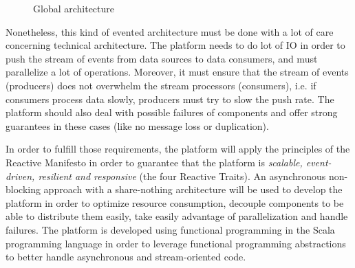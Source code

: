 \begin{figure}[h]
  \begin{center}
    \caption{Global architecture}
    \label{fig:main_archi}
  \end{center}
\end{figure}

Nonetheless, this kind of evented architecture must be done with a lot of care concerning technical architecture.
The platform needs to do lot of IO in order to push the stream of events from data sources to data consumers, and must
parallelize a lot of operations. Moreover, it must ensure that the stream of events (producers) does not overwhelm the stream
processors (consumers), i.e. if consumers process data slowly, producers must try to slow the push rate. The platform should also deal with possible
failures of components and offer strong guarantees in these cases (like no message loss or duplication).

In order to fulfill those requirements, the platform will apply the principles of the Reactive Manifesto  in order to guarantee
that the platform is \textit{scalable, event-driven, resilient and responsive} (the four Reactive Traits). An asynchronous non-blocking approach with a share-nothing architecture will be used to develop the platform in order to optimize resource consumption, decouple components to be able to distribute them easily, take easily advantage of parallelization and handle failures. 
The platform is developed using functional programming in the Scala programming language  in order to leverage functional programming abstractions to better handle asynchronous and stream-oriented code.
\\

